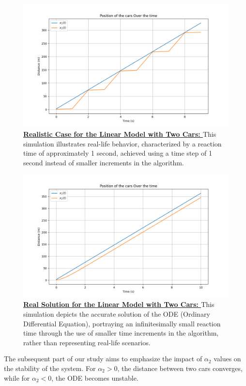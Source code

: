 \documentclass{article}
\begin{document}
		\begin{figure}[H]
			\centering
			\includegraphics[width=0.8\linewidth]{RealisticCase.png}
			\caption[Realistic Case for the Linear Model with Two Cars]{\textbf{\underline{Realistic Case for the Linear Model with Two Cars: }}This simulation illustrates real-life behavior, characterized by a reaction time of approximately 1 second, achieved using a time step of 1 second instead of smaller increments in the algorithm.}
			\label{fig:RC1}
		\end{figure}
		
		\begin{figure}[H]
			\centering
			\includegraphics[width=0.8\linewidth]{RealSolCase.png}
			\caption[Real Solution for the Linear Model with Two Cars]{\textbf{\underline{Real Solution for the Linear Model with Two Cars: }}This simulation depicts the accurate solution of the ODE (Ordinary Differential Equation), portraying an infinitesimally small reaction time through the use of smaller time increments in the algorithm, rather than representing real-life scenarios.}
			\label{fig:RS1}
		\end{figure}
		
		The subsequent part of our study aims to emphasize the impact of \(\alpha_2\) values on the stability of the system. For \(\alpha_2 > 0\), the distance between two cars converges, while for \(\alpha_2 < 0\), the ODE becomes unstable.
		
\end{document}
